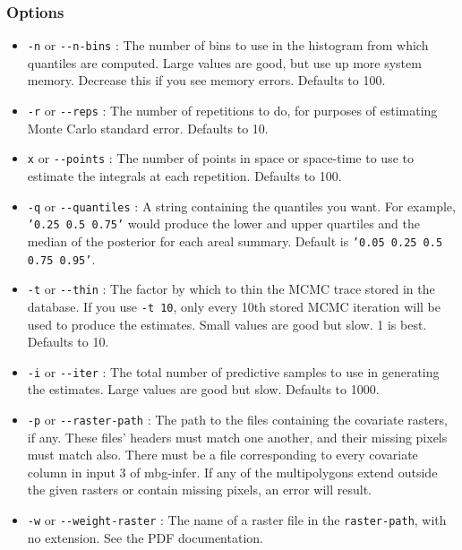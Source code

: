 \subsubsection{Options%
}
%
\begin{itemize}

\item \texttt{-n} or \texttt{-{}-n-bins} : The number of bins to use in the histogram from which quantiles
are computed. Large values are good, but use up more system memory. Decrease this if you
see memory errors. Defaults to 100.

\item \texttt{-r} or \texttt{-{}-reps} : The number of repetitions to do, for purposes of estimating Monte
Carlo standard error. Defaults to 10.

\item \texttt{x} or \texttt{-{}-points} : The number of points in space or space-time to use to estimate the
integrals at each repetition. Defaults to 100.

\item \texttt{-q} or \texttt{-{}-quantiles} : A string containing the quantiles you want. For example,
\texttt{'0.25 0.5 0.75'} would produce the lower and upper quartiles and the median of the
posterior for each areal summary. Default is \texttt{'0.05 0.25 0.5 0.75 0.95'}.

\item \texttt{-t} or \texttt{-{}-thin} : The factor by which to thin the MCMC trace stored in the database.
If you use \texttt{-t 10}, only every 10th stored MCMC iteration will be used to produce the
estimates. Small values are good but slow. 1 is best. Defaults to 10.

\item \texttt{-i} or \texttt{-{}-iter} : The total number of predictive samples to use in generating the
estimates. Large values are good but slow. Defaults to 1000.

\item \texttt{-p} or \texttt{-{}-raster-path} : The path to the files containing the covariate rasters, if any.
These files' headers must match one another, and their missing pixels must match also. There
must be a file corresponding to every covariate column in input 3 of mbg-infer. If any of the
multipolygons extend outside the given rasters or contain missing pixels, an error will result.

\item \texttt{-w} or \texttt{-{}-weight-raster} : The name of a raster file in the \texttt{raster-path}, with no
extension. See the PDF documentation.


\end{itemize}
